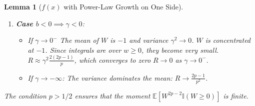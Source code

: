 \documentclass[11pt]{article}
\newtheorem{lemma}{Lemma}
\begin{document}
\begin{lemma}[$f(x)$ with Power-Law Growth on One Side]
\begin{enumerate}
    \item \textbf{Case $b<0 \implies \gamma < 0$}:
    \begin{itemize}
        \item If $\gamma \to 0^-$ The mean of $W$ is $-1$ and variance $\gamma^2 \to 0$. $W$ is concentrated at $-1$. Since integrals are over $w \ge 0$, they become very small.
        $R \approx \gamma^2 \frac{2(2p-1)}{p}$, which converges to zero $R\to 0 $ as $\gamma \to 0^-.$
        \item If $\gamma \to -\infty$: The variance dominates the mean: $R \to \frac{2p-1}{p^2}$.
    \end{itemize}
\end{enumerate}

The condition $p>1/2$ ensures that the moment $\mathbb{E}[W^{2p-2}\mathbb{I}(W \ge 0)]$ is finite.
\end{lemma}
\end{document}
